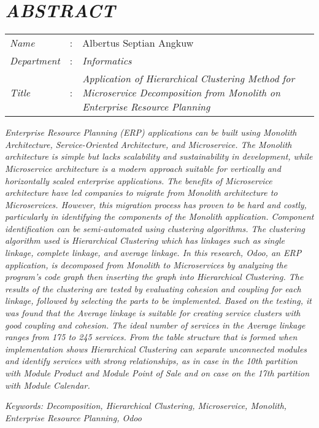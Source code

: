 \chapter*{\textit{ABSTRACT}}

\begin{longtable}{@{}p{2.5cm} l p{10.3cm}}
	\textit{Name} 			& : & Albertus Septian Angkuw \\
	\textit{Department}		& : & \textit{Informatics} \\
	\textit{Title}			& : & \textit{Application of Hierarchical Clustering Method for Microservice Decomposition from Monolith on Enterprise Resource Planning} \\
	
	
\end{longtable}


\textit{
	Enterprise Resource Planning (ERP) applications can be built using Monolith Architecture, Service-Oriented Architecture, and Microservice. The Monolith architecture is simple but lacks scalability and sustainability in development, while Microservice architecture is a modern approach suitable for vertically and horizontally scaled enterprise applications. The benefits of Microservice architecture have led companies to migrate from Monolith architecture to Microservices. However, this migration process has proven to be hard and costly, particularly in identifying the components of the Monolith application. Component identification can be semi-automated using clustering algorithms. The clustering algorithm used is Hierarchical Clustering which has linkages such as single linkage, complete linkage, and average linkage. In this research, Odoo, an ERP application, is decomposed from Monolith to Microservices by analyzing the program's code graph then  inserting the graph into Hierarchical Clustering. The results of the clustering are tested by evaluating cohesion and coupling for each linkage, followed by selecting the parts to be implemented. Based on the testing, it was found that the Average linkage is suitable for creating service clusters with good coupling and cohesion. The ideal number of services in the Average linkage ranges from 175 to 245 services. From the table structure that is formed when implementation shows Hierarchical Clustering can separate unconnected modules and identify services with strong relationships, as in case
	in the 10th partition with Module Product and Module Point of Sale and on case
	on the 17th partition with Module Calendar.}


\noindent \textit{Keywords:  Decomposition, Hierarchical Clustering, Microservice, Monolith, Enterprise Resource Planning, Odoo}